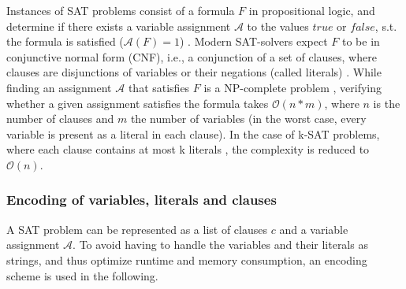 Instances of SAT problems consist of a formula $F$ in propositional logic, and determine if there exists a variable assignment $\mathcal{A}$ to the values $true$ or $false$, s.t. the formula is satisfied ($\mathcal{A}(F) = 1$) \cite{Biere2009}. Modern SAT-solvers expect $F$ to be in conjunctive normal form (CNF), i.e., a conjunction of a set of clauses, where clauses are disjunctions of variables or their negations (called literals) \cite{cnf_math_encycl}. While finding an assignment $\mathcal{A}$ that satisfies $F$ is a NP-complete problem \cite{Biere2009}, verifying whether a given assignment satisfies the formula takes $\mathcal{O}(n*m)$, where $n$ is the number of clauses and $m$ the number of variables (in the worst case, every variable is present as a literal in each clause). In the case of k-SAT problems, where each clause contains at most k literals \cite{Biere2009}, the complexity is reduced to $\mathcal{O}(n)$.

\subsubsection{Encoding of variables, literals and clauses}
A SAT problem can be represented as a list of clauses $c$ and a variable assignment $\mathcal{A}$. To avoid having to handle the variables and their literals as strings, and thus optimize runtime and memory consumption, an encoding scheme \cite{sabablog} is used in the following.

